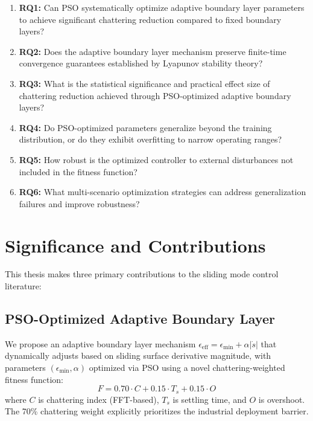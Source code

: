 \documentclass[12pt,a4paper,oneside]{report}
\newcommand{\eeff}{\epsilon_{\text{eff}}}
\newcommand{\emin}{\epsilon_{\min}}
\newcommand{\Ts}{T_s}
\begin{document}
\begin{enumerate}
\item \textbf{RQ1:} Can PSO systematically optimize adaptive boundary layer parameters to achieve significant chattering reduction compared to fixed boundary layers?

\item \textbf{RQ2:} Does the adaptive boundary layer mechanism preserve finite-time convergence guarantees established by Lyapunov stability theory?

\item \textbf{RQ3:} What is the statistical significance and practical effect size of chattering reduction achieved through PSO-optimized adaptive boundary layers?

\item \textbf{RQ4:} Do PSO-optimized parameters generalize beyond the training distribution, or do they exhibit overfitting to narrow operating ranges?

\item \textbf{RQ5:} How robust is the optimized controller to external disturbances not included in the fitness function?

\item \textbf{RQ6:} What multi-scenario optimization strategies can address generalization failures and improve robustness?
\end{enumerate}

\section{Significance and Contributions}

This thesis makes three primary contributions to the sliding mode control literature:

\subsection{PSO-Optimized Adaptive Boundary Layer}

We propose an adaptive boundary layer mechanism $\eeff = \emin + \alpha|\dot{s}|$ that dynamically adjusts based on sliding surface derivative magnitude, with parameters $(\emin, \alpha)$ optimized via PSO using a novel chattering-weighted fitness function:
\begin{equation}
F = 0.70 \cdot C + 0.15 \cdot \Ts + 0.15 \cdot O
\end{equation}
where $C$ is chattering index (FFT-based), $\Ts$ is settling time, and $O$ is overshoot. The 70\% chattering weight explicitly prioritizes the industrial deployment barrier.
\end{document}
